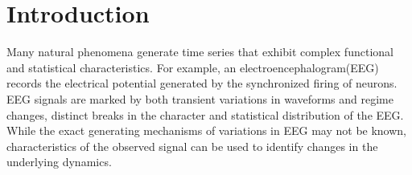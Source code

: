 
% 

% 

\chapter{Introduction}



Many natural phenomena generate time series that
exhibit complex functional and statistical 
characteristics.
For example, an electroencephalogram(EEG) records
the electrical potential generated by the synchronized
firing of neurons. EEG signals are marked by both transient 
variations in waveforms and regime changes, distinct
breaks in the character and statistical distribution
of the EEG.
While the exact generating mechanisms of
variations in EEG may not be known, characteristics
 of the observed signal can be 
used to identify changes in the underlying dynamics.

